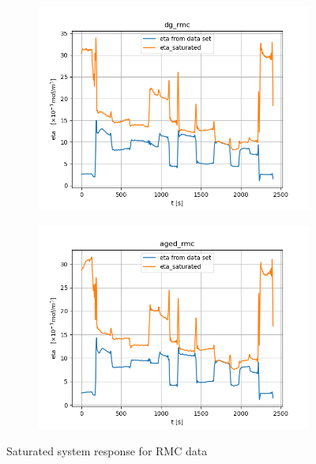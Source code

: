 \begin{figure}[H]
        \begin{minipage}{0.49\textwidth}
                \begin{figure}[H]
                        \centering
                        \includegraphics[width=\textwidth]{./figs/14_figs/bounded_eta_plots/eta_bounds_dg_rmc.png}
                \end{figure}
        \end{minipage}
        \begin{minipage}{0.49\textwidth}
                \begin{figure}[H]
                        \centering
                        \includegraphics[width=\textwidth]{./figs/14_figs/bounded_eta_plots/eta_bounds_aged_rmc.png}
                \end{figure}
        \end{minipage}
        \caption{Saturated system response for RMC data}
\end{figure}
